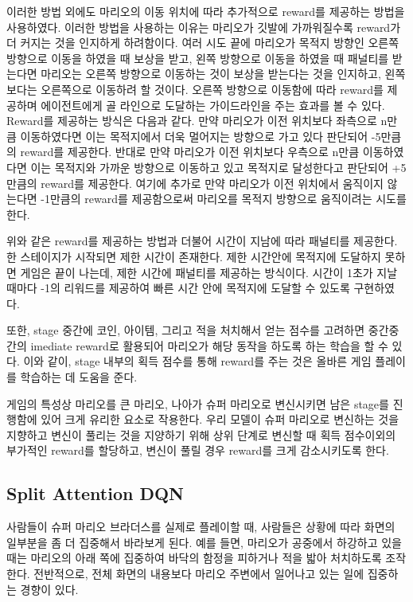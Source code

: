 이러한 방법 외에도 마리오의 이동 위치에 따라 추가적으로 reward를 제공하는 방법을 사용하였다. 
이러한 방법을 사용하는 이유는 마리오가 깃발에 가까워질수록 reward가 더 커지는 것을 인지하게 하려함이다. 
여러 시도 끝에 마리오가 목적지 방향인 오른쪽 방향으로 이동을 하였을 때 보상을 받고, 왼쪽 방향으로 이동을 하였을 때 패널티를 받는다면 마리오는 오른쪽 방향으로 이동하는 것이 보상을 받는다는 것을 인지하고, 왼쪽보다는 오른쪽으로 이동하려 할 것이다.
오른쪽 방향으로 이동함에 따라 reward를 제공하며 에이전트에게 골 라인으로 도달하는 가이드라인을 주는 효과를 볼 수 있다.
Reward를 제공하는 방식은 다음과 같다.
만약 마리오가 이전 위치보다 좌측으로 n만큼 이동하였다면 이는 목적지에서 더욱 멀어지는 방향으로 가고 있다 판단되어 -5만큼의 reward를 제공한다. 
반대로 만약 마리오가 이전 위치보다 우측으로 n만큼 이동하였다면 이는 목적지와 가까운 방향으로 이동하고 있고 목적지로 달성한다고 판단되어 +5만큼의 reward를 제공한다.
여기에 추가로 만약 마리오가 이전 위치에서 움직이지 않는다면 -1만큼의 reward를 제공함으로써 마리오를 목적지 방향으로 움직이려는 시도를 한다. 

위와 같은 reward를 제공하는 방법과 더불어 시간이 지남에 따라 패널티를 제공한다. 
한 스테이지가 시작되면 제한 시간이 존재한다. 
제한 시간안에 목적지에 도달하지 못하면 게임은 끝이 나는데, 제한 시간에 패널티를 제공하는 방식이다. 
시간이 1초가 지날 때마다 -1의 리워드를 제공하여 빠른 시간 안에 목적지에 도달할 수 있도록 구현하였다. 






또한, stage 중간에 코인, 아이템, 그리고 적을 처치해서 얻는 점수를 고려하면 중간중간의 imediate reward로 활용되어 마리오가 해당 동작을 하도록 하는 학습을 할 수 있다.
이와 같이, stage 내부의 획득 점수를 통해 reward를 주는 것은 올바른 게임 플레이를 학습하는 데 도움을 준다.

게임의 특성상 마리오를 큰 마리오, 나아가 슈퍼 마리오로 변신시키면 남은 stage를 진행함에 있어 크게 유리한 요소로 작용한다.
우리 모델이 슈퍼 마리오로 변신하는 것을 지향하고 변신이 풀리는 것을 지양하기 위해 상위 단계로 변신할 때 획득 점수이외의 부가적인 reward를 할당하고, 변신이 풀릴 경우 reward를 크게 감소시키도록 한다.

\subsection{Split Attention DQN}
\label{sec:method:idea}
사람들이 슈퍼 마리오 브라더스를 실제로 플레이할 때, 사람들은 상황에 따라 화면의 일부분을 좀 더 집중해서 바라보게 된다.
예를 들면, 마리오가 공중에서 하강하고 있을 때는 마리오의 아래 쪽에 집중하여 바닥의 함정을 피하거나 적을 밟아 처치하도록 조작한다.
전반적으로, 전체 화면의 내용보다 마리오 주변에서 일어나고 있는 일에 집중하는 경향이 있다.

